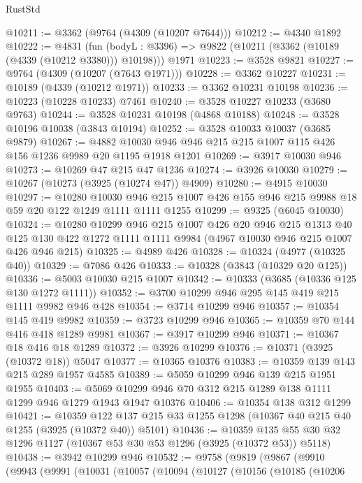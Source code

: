 \begin{lexlean}{RustStd}
\begin{coremodule}
@10211 := @3362 (@9764 (@4309 (@10207 @7644)))
@10212 := @4340 @1892
@10222 := @4831
    (fun (bodyL : @3396) => @9822 (@10211 (@3362 (@10189 (@4339 (@10212 @3380))) @10198)))
    @1971
@10223 := @3528 @9821
@10227 := @9764 (@4309 (@10207 (@7643 @1971)))
@10228 := @3362 @10227
@10231 := @10189 (@4339 (@10212 @1971))
@10233 := @3362 @10231 @10198
@10236 := @10223 (@10228 @10233) @7461
@10240 := @3528 @10227 @10233 (@3680 @9763)
@10244 := @3528 @10231 @10198 (@4868 @10188)
@10248 := @3528 @10196 @10038 (@3843 @10194)
@10252 := @3528 @10033 @10037 (@3685 @9879)
@10267 := @4882 @10030 @946 @946 @215 @215 @1007 @115 @426 @156 @1236 @9989 @20 @1195 @1918 @1201
@10269 := @3917 @10030 @946
@10273 := @10269 @47 @215 @47 @1236
@10274 := @3926 @10030
@10279 := @10267 (@10273 (@3925 (@10274 @47)) @4909)
@10280 := @4915 @10030
@10297 := @10280
    @10030
    @946
    @215
    @1007
    @426
    @155
    @946
    @215
    @9988
    @18
    @59
    @20
    @122
    @1249
    @1111
    @1111
    @1255
@10299 := @9325 (@6045 @10030)
@10324 := @10280
    @10299
    @946
    @215
    @1007
    @426
    @20
    @946
    @215
    @1313
    @40
    @125
    @130
    @422
    @1272
    @1111
    @1111
    @9984
    (@4967 @10030 @946 @215 @1007 @426 @946 @215)
@10325 := @4989 @426
@10328 := @10324 (@4977 (@10325 @40))
@10329 := @7086 @426
@10333 := @10328 (@3843 (@10329 @20 @125))
@10336 := @5003 @10030 @215 @1007
@10342 := @10333 (@3685 (@10336 @125 @130 @1272 @1111))
@10352 := @3700 @10299 @946 @295 @145 @419 @215 @1111 @9982 @946 @428
@10354 := @3714 @10299 @946
@10357 := @10354 @145 @419 @9982
@10359 := @3723 @10299 @946
@10365 := @10359 @70 @144 @416 @418 @1289 @9981
@10367 := @3917 @10299 @946
@10371 := @10367 @18 @416 @18 @1289
@10372 := @3926 @10299
@10376 := @10371 (@3925 (@10372 @18)) @5047
@10377 := @10365 @10376
@10383 := @10359 @139 @143 @215 @289 @1957 @4585
@10389 := @5059 @10299 @946 @139 @215 @1951 @1955
@10403 := @5069 @10299 @946 @70 @312 @215 @1289 @138 @1111 @1299 @946 @1279 @1943 @1947 @10376
@10406 := @10354 @138 @312 @1299
@10421 := @10359
    @122
    @137
    @215
    @33
    @1255
    @1298
    (@10367 @40 @215 @40 @1255 (@3925 (@10372 @40)) @5101)
@10436 := @10359 @135 @55 @30 @32 @1296 @1127 (@10367 @53 @30 @53 @1296 (@3925 (@10372 @53)) @5118)
@10438 := @3942 @10299 @946
@10532 := @9758
    (@9819
      (@9867
        (@9910
          (@9943
            (@9991
              (@10031
                (@10057
                  (@10094
                    (@10127
                      (@10156
                        (@10185
                          (@10206

\end{coremodule}
\end{lexlean}
